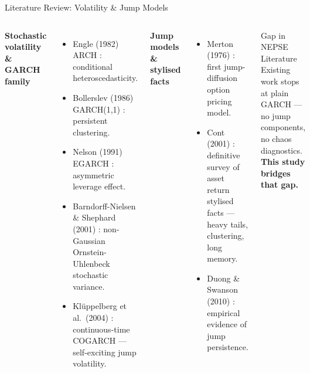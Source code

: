 \documentclass[10pt, aspectratio=169]{beamer}
\begin{document}
\begin{frame}{Literature Review: Volatility \& Jump Models}
\begin{columns}[T]
  \textbf{Stochastic volatility \& GARCH family}
  \begin{itemize}\small
    \item Engle (1982) ARCH \cite{engle1982autoregressive}:
          conditional heteroscedasticity.
    \item Bollerslev (1986) GARCH(1,1)
          \cite{bollerslev1986generalized}: persistent clustering.
    \item Nelson (1991) EGARCH \cite{nelson1991conditional}:
          asymmetric leverage effect.
    \item Barndorff-Nielsen \& Shephard (2001)
          \cite{barndorff2001non}: non-Gaussian
          Ornstein-Uhlenbeck stochastic variance.
    \item Kl\"uppelberg et al.\ (2004)
          \cite{kluppelberg2004continuous}: continuous-time
          COGARCH — self-exciting jump volatility.
  \end{itemize}
  \textbf{Jump models \& stylised facts}
  \begin{itemize}\small
    \item Merton (1976) \cite{merton1976option}: first
          jump-diffusion option pricing model.
    \item Cont (2001) \cite{cont2001empirical}: definitive
          survey of asset return stylised facts — heavy tails,
          clustering, long memory.
    \item Duong \& Swanson (2010) \cite{duong2010empirical}:
          empirical evidence of jump persistence.
  \end{itemize}
  \vspace{0.15cm}
  \begin{block}{Gap in NEPSE Literature}
    Existing work \cite{gajurel2021volatility} stops at plain
    GARCH — no jump components, no chaos diagnostics.
    \textbf{This study bridges that gap.}
  \end{block}
\end{columns}
\end{frame}
\end{document}
